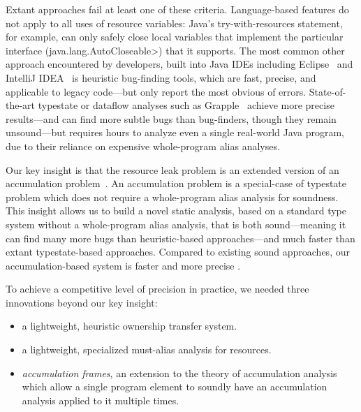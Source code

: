 Extant approaches fail at least one of these criteria.
Language-based features do not apply to all uses of resource variables:
Java's try-with-resources statement, for example, can
only safely close local variables that implement the particular
interface (\<java.lang.AutoCloseable>) that it supports.
The most common other
approach encountered by developers, built into Java IDEs including
Eclipse~\cite{ecj-resource-leak} and IntelliJ
IDEA~\cite{idea-resource-leak} is heuristic bug-finding tools, which
are fast, precise, and applicable to legacy code---but only report the most obvious of
errors. State-of-the-art typestate or dataflow analyses such as
Grapple~\cite{zuo2019grapple} achieve more precise results---and
can find more subtle bugs than bug-finders, though they remain unsound---but
requires hours to analyze even a single real-world Java program, due
to their reliance on expensive whole-program alias analyses.

Our key insight is that the resource leak problem is an extended
version of an accumulation problem~\cite{kellogg20verifying}. An
accumulation problem is a special-case of typestate problem which does
not require a whole-program alias analysis for soundness.  This
insight allows us to build a novel static analysis, based on a
standard type system without a whole-program alias analysis, that is
both sound---meaning it can find many more bugs than heuristic-based
approaches---and much faster than extant typestate-based approaches.
Compared to existing sound approaches, our accumulation-based system
is faster and more precise .

To achieve a competitive level of precision in practice, we needed three
innovations beyond our key insight:
\begin{itemize}
\item a lightweight, heuristic ownership transfer system.
\item a lightweight, specialized must-alias analysis for resources.
\item \emph{accumulation frames}, an extension to the theory of
  accumulation analysis which allow a single program element to
  soundly have an accumulation analysis applied to it multiple times.
\end{itemize}

